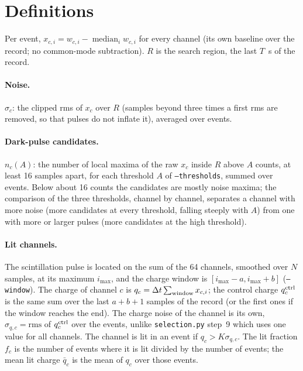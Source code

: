 \documentclass[11pt]{article}
\newcommand{\code}[1]{\texttt{#1}}
\newcommand{\us}{\textmu s}
\begin{document}
\section{Definitions}

Per event, $x_{c,i} = w_{c,i} - \operatorname{median}_i w_{c,i}$ for every
channel (its own baseline over the record; no common-mode subtraction).
$R$ is the search region, the last $T$~\us{} of the record.

\paragraph{Noise.} $\sigma_c$: the clipped rms of $x_c$ over $R$
(samples beyond three times a first rms are removed, so that pulses do
not inflate it), averaged over events.

\paragraph{Dark-pulse candidates.} $n_c(A)$: the number of local maxima of
the raw $x_c$ inside $R$ above $A$ counts, at least 16 samples apart, for
each threshold $A$ of \code{--thresholds}, summed over events. Below
about 16 counts the candidates are mostly noise maxima; the comparison of
the three thresholds, channel by channel, separates a channel with more
noise (more candidates at every threshold, falling steeply with $A$) from
one with more or larger pulses (more candidates at the high threshold).

\paragraph{Lit channels.} The scintillation pulse is located on the sum
of the 64 channels, smoothed over $N$ samples, at its maximum $i_{\max}$,
and the charge window is $[i_{\max} - a, i_{\max} + b]$
(\code{--window}). The charge of channel $c$ is $q_c = \Delta t \sum_{\rm
window} x_{c,i}$; the control charge $q_c^{\rm ctrl}$ is the same sum
over the last $a + b + 1$ samples of the record (or the first ones if the
window reaches the end). The charge noise of the channel is its own,
$\sigma_{q,c} = \mathrm{rms}$ of $q_c^{\rm ctrl}$ over the events, unlike
\code{selection.py} step~9 which uses one value for all channels. The
channel is lit in an event if $q_c > K \sigma_{q,c}$. The lit fraction
$f_c$ is the number of events where it is lit divided by the number of
events; the mean lit charge $\bar q_c$ is the mean of $q_c$ over those
events.
\end{document}
